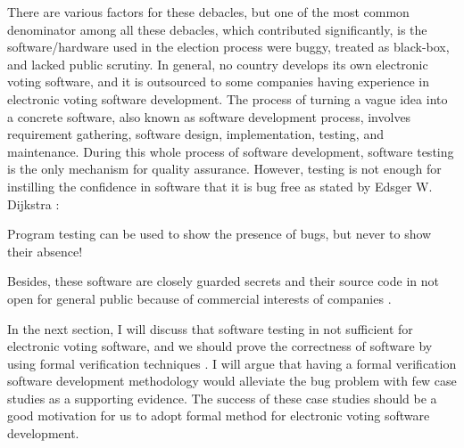    There are various factors for these debacles, but one of the most 
   common denominator among all these debacles,
   which contributed significantly,  is the software/hardware used in the election process 
   were buggy, treated as black-box,  and lacked public scrutiny.
   In general, no country develops its own electronic voting software, and it is outsourced 
   to some companies having experience in electronic voting software development.  
   The process 
   of turning a vague idea into a 
   concrete software, also known as software development process, involves 
   requirement gathering, software design, implementation, testing, and maintenance. 
   During this whole process of software development, software testing is the only 
   mechanism for quality assurance. However, testing is not enough for 
   instilling the confidence in software that it is bug free 
   as stated by Edsger W. Dijkstra \citep{Dijkstra:1972:HP:355604.36159}:
   \begin{displayquote}
   Program testing can be used to show the presence of bugs, 
    but never to show their absence!
   \end{displayquote}
    Besides, these software 
    are closely guarded secrets and their source 
   code in not open for general public because of commercial 
   interests of companies \citep{AEC:2013:LMM}. 
   
%   
%   

   In the next section, I will discuss that software testing 
   in not sufficient for electronic voting software, and we should 
   prove the  correctness of software
   by using formal verification techniques \citep{BECKERT2014115}.
   I will argue that  having a formal verification software development methodology would alleviate 
	the bug problem with few case studies as a supporting evidence. The success of these 
	case studies should be a good motivation for us to 
	adopt formal method for electronic voting software development. 
   
